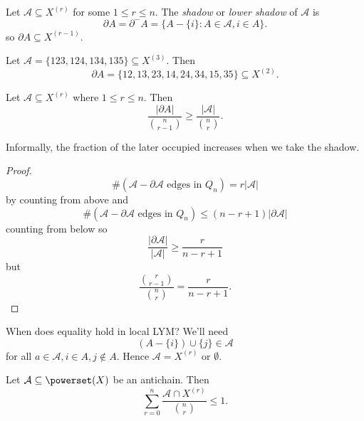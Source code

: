 \documentclass[a4paper]{article}
\newcommand{\shadow}{\partial}
\begin{document}
\begin{definition}
  Let \(\mathcal A \subseteq X^{(r)}\) for some \(1 \leq r \leq n\). The \emph{shadow} or \emph{lower shadow} of \(\mathcal A\) is
  \[
    \shadow A = \shadow^- A = \{A - \{i\}: A \in \mathcal A, i \in A\}.
  \]
  so \(\shadow A \subseteq X^{(r - 1)}\).
\end{definition}

\begin{eg}
  Let \(\mathcal A = \{123, 124, 134, 135\} \subseteq X^{(3)}\). Then
  \[
    \shadow A = \{12, 13, 23, 14, 24, 34, 15, 35\} \subseteq X^{(2)}.
  \]
\end{eg}

\begin{lemma}
  Let \(\mathcal A \subseteq X^{(r)}\) where \(1 \leq r \leq n\). Then
  \[
    \frac{|\shadow A|}{\binom{n}{r - 1}} \geq \frac{|\mathcal A|}{\binom{n}{r}}.
  \]
\end{lemma}

Informally, the fraction of the later occupied increases when we take the shadow.

\begin{proof}
  \[
    \#(\mathcal A - \shadow \mathcal A \text{ edges in } Q_n) = r|\mathcal A|
  \]
  by counting from above and
  \[
    \#(\mathcal A - \shadow \mathcal A \text{ edges in } Q_n) \leq (n - r + 1) |\shadow \mathcal A|
  \]
  counting from below so
  \[
    \frac{|\shadow \mathcal A|}{|\mathcal A|} \geq \frac{r}{n - r + 1}
  \]
  but
  \[
    \frac{\binom{r}{r - 1}}{\binom{n}{r}} = \frac{r}{n - r + 1}.
  \]
\end{proof}

When does equality hold in local LYM? We'll need
\[
  (A - \{i\}) \cup \{j\} \in \mathcal A
\]
for all \(a \in \mathcal A, i \in A, j \notin A\). Hence \(\mathcal A = X^{(r)}\) or \(\emptyset\).

\begin{theorem}
  Let \(\mathcal A \subseteq \powerset(X)\) be an antichain. Then
  \[
    \sum_{r = 0}^n \frac{\mathcal A \cap X^{(r)}}{\binom{n}{r}} \leq 1.
  \]
\end{theorem}
\end{document}
